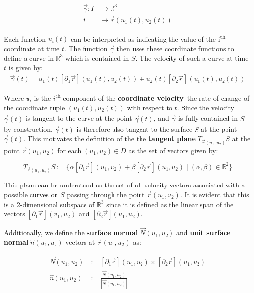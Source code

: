 \documentclass{article}
\begin{document}
\begin{align*}
  \vec{\gamma} : I &\to \mathbb{R}^3 \\
  t &\mapsto \vec{r}(u_1(t), u_2(t))
\end{align*}

Each function $u_i(t)$ can be interpreted as indicating the value of the i\textsuperscript{th} coordinate at time $t$. The function $\vec{\gamma}$ then uses these coordinate functions to define a curve in $\mathbb{R}^3$ which is contained in $S$. The velocity of such a curve at time $t$ is given by:
\begin{equation*}
  \dot{\vec{\gamma}}(t) = \dot{u}_1(t) [\partial_1 \vec{r}](u_1(t), u_2(t)) + \dot{u}_2(t) [\partial_2 \vec{r}](u_1(t), u_2(t))
\end{equation*}

Where $\dot{u}_i$ is the $i$\textsuperscript{th} component of the \textbf{coordinate velocity}--the rate of change of the coordinate tuple $(u_1(t), u_2(t))$ with respect to $t$. Since the velocity $\dot{\vec{\gamma}}(t)$ is tangent to the curve at the point $\vec{\gamma}(t)$, and $\vec{\gamma}$ is fully contained in $S$ by construction, $\dot{\vec{\gamma}}(t)$ is therefore also tangent to the surface $S$ at the point $\vec{\gamma}(t)$. This motivates the definition of the the \textbf{tangent plane} $T_{\vec{r}(u_1, u_2)}S$ at the point $\vec{r}(u_1, u_2)$ for each $(u_1, u_2) \in D$ as the set of vectors given by:

\begin{equation*}
  T_{\vec{r}(u_1, u_2)}S := \{\alpha [\partial_1 \vec{r}](u_1, u_2) + \beta [\partial_2 \vec{r}](u_1, u_2) \mid (\alpha, \beta) \in \mathbb{R}^2\}
\end{equation*}

This plane can be understood as the set of all velocity vectors associated with all possible curves on $S$ passing through the point $\vec{r}(u_1, u_2)$. It is evident that this is a 2-dimensional subspace of $\mathbb{R}^3$ since it is defined as the linear span of the vectors $[\partial_1 \vec{r}](u_1, u_2)$ and $[\partial_2 \vec{r}](u_1, u_2)$.

Additionally, we define the \textbf{surface normal} $\vec{N}(u_1, u_2)$ and \textbf{unit surface normal} $\hat{n}(u_1, u_2)$ vectors at $\vec{r}(u_1, u_2)$ as:

\begin{align*}
  \vec{N}(u_1, u_2) &:= [\partial_1 \vec{r}](u_1, u_2) \times [\partial_2 \vec{r}](u_1, u_2) \\
  \hat{n}(u_1, u_2) &:= \frac{\vec{N}(u_1, u_2)}{|\vec{N}(u_1, u_2)|}
\end{align*}
\end{document}
